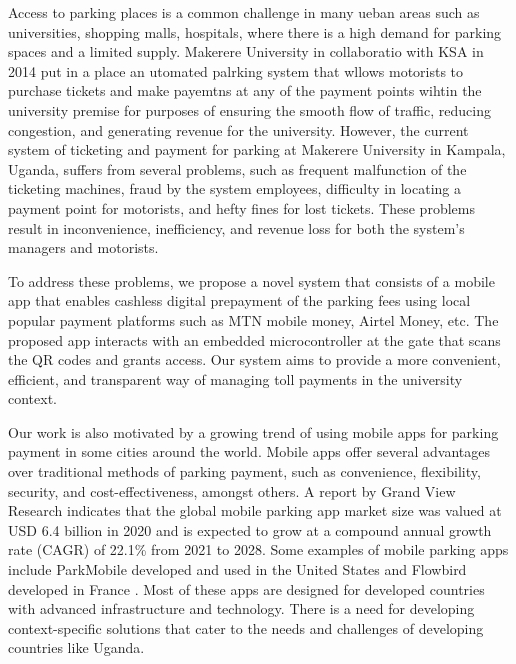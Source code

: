 Access to parking places is a common challenge in many ueban areas such as universities, shopping malls, hospitals, where there is a high demand for parking spaces and a limited supply.
Makerere University in collaboratio with KSA in 2014 put in a place an utomated palrking system that wllows motorists to purchase tickets and make payemtns at any of the payment points wihtin the university premise for purposes of ensuring the smooth flow of traffic, reducing congestion, and generating revenue for the university. However, the current system of ticketing and payment for parking at Makerere University in Kampala, Uganda, suffers from several problems, such as frequent malfunction of the ticketing machines, fraud by the system employees, difficulty in locating a payment point for motorists, and hefty fines for lost tickets. These problems result in inconvenience, inefficiency, and revenue loss for both the system’s managers and motorists.

To address these problems, we propose a novel system that consists of a mobile app that enables cashless digital prepayment of the parking fees using local popular payment platforms such as MTN mobile money, Airtel Money, etc. The proposed app interacts with an embedded microcontroller at the gate that scans the QR codes and grants access. Our system aims to provide a more convenient, efficient, and transparent way of managing toll payments in the university context.

Our work is also motivated by a  growing trend of using mobile apps for parking payment in some  cities around the world. Mobile apps offer several advantages over traditional methods of parking payment, such as convenience, flexibility, security, and cost-effectiveness, amongst others. A report by Grand View Research indicates that the global mobile parking app market size was valued at USD 6.4 billion in 2020 and is expected to grow at a compound annual growth rate (CAGR) of 22.1\% from 2021 to 2028. Some examples of mobile parking apps include ParkMobile developed and used in the United States and Flowbird developed in France . Most of these apps are designed for developed countries with advanced infrastructure and technology. There is a need for developing context-specific solutions that cater to the needs and challenges of developing countries like Uganda.
\clearpage